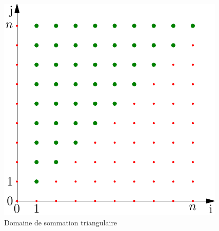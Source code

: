 \begin{figure}[h]
  \centering
  \includegraphics{./Csomm4_1.pdf}
  \caption{Domaine de sommation triangulaire}
  \label{fig:Csomm4_1}
\end{figure}

